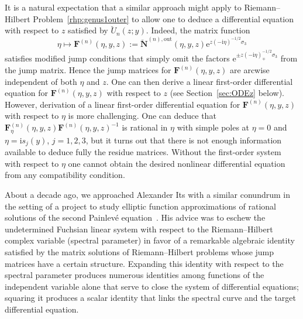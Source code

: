 It is a natural expectation that a similar approach might apply to Riemann--Hilbert Problem~\ref{rhp:genus1outer} to allow one to deduce a differential equation with respect to $z$ satisfied by $\breve{U}_n(z;y)$. Indeed, the matrix function
\begin{equation}
\eta\mapsto\mathbf{F}^{(n)}(\eta,y,z):=\breve{\mathbf{N}}^{(n),\mathrm{out}}(\eta,y,z)\mathrm{e}^{z(-\mathrm{i}\eta)^{-1/2}\sigma_3}
\label{eq:F-N}
\end{equation}
satisfies modified jump conditions that simply omit the factors $\mathrm{e}^{\pm z(-\mathrm{i}\eta)_{\mp}^{-1/2}\sigma_3}$ from the jump matrix. Hence the jump matrices for $\mathbf{F}^{(n)}(\eta,y,z)$ are arcwise independent of both $\eta$ and $z$. One can then derive a linear first-order differential equation for $\mathbf{F}^{(n)}(\eta,y,z)$ with respect to $z$ (see Section~\ref{sec:ODEz} below). However, derivation of a linear first-order differential equation for $\mathbf{F}^{(n)}(\eta,y,z)$ with respect to $\eta$ is more challenging. One can deduce that $\mathbf{F}^{(n)}_\eta(\eta,y,z)\mathbf{F}^{(n)}(\eta,y,z)^{-1}$ is rational in $\eta$ with simple poles at $\eta=0$ and $\eta=\mathrm{i} s_j(y)$, $j=1,2,3$, but it turns out that there is not enough information available to deduce fully the residue matrices. Without the first-order system with respect to $\eta$ one cannot obtain the desired nonlinear differential equation from any compatibility condition.

About a decade ago, we approached Alexander Its with a similar conundrum in the
setting of a project to study elliptic function approximations of rational solutions
of the second Painlev\'e equation~\cite{BuckinghamM14}. His advice was to
eschew the undetermined Fuchsian linear system with respect to the Riemann--Hilbert
complex variable (spectral parameter) in favor of a remarkable algebraic identity
satisfied by the matrix solutions of Riemann--Hilbert problems whose jump matrices
have a certain structure. Expanding this identity with respect to the spectral
parameter produces numerous identities among functions of the independent variable
alone that serve to close the system of differential equations; squaring it produces
a scalar identity that links the spectral curve and the target differential equation.

